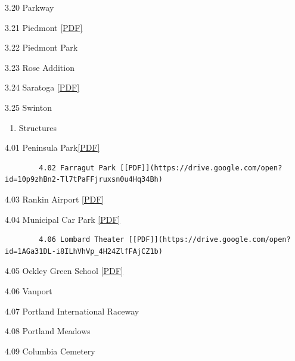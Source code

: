 \documentclass[
  12pt,
]{book}
\providecommand{\tightlist}{%
  \setlength{\itemsep}{0pt}\setlength{\parskip}{0pt}}
\begin{document}
3.20 Parkway

3.21 Piedmont \href{https://l.facebook.com/l.php?u=https\%3A\%2F\%2Fdrive.google.com\%2Fopen\%3Fid\%3D1-9EhdqV51Y03rqUdg9TRgpD-xLiKQvQi\&h=AT3nGsWmXhbQfW9A2d5Qky-O-fy3KsvekepBBd3uEGmoKh0FijpfGT5DpcKsh9-Zt3b2c2v5TnvZ4ddoydn__lb0fA8blySjjnTpQJMzTyYehW2h8JKgDHUh6LYYn_FT-2k1soRzIMc_VGwykcrQHuQRtj1lPaUXkcXBm2k-O_BKdi2HIy7qkHaOH5QPDc3bSqJrKkswdXNRDIUDjrPKAVujS-IMBTKFVtWCKVJEpSgFFfAKkLTlAE5VbJtspKZm0xzSrmJQlieHyWLnEaTGcXlaNmw_BdWhE118AcHAfb1ZybOS0suTqJibOPbAhIOZILkK2Q5GJD38IKvigNVa-f2CDPw724oLFtG4Rkig7ErCQRaAdVf0vdZy2aNrTm2zg8JlxyrXLuMusgNtmo3HhQ}{{[}PDF{]}}

3.22 Piedmont Park

3.23 Rose Addition

3.24 Saratoga \href{https://drive.google.com/open?id=1OHx5hx1NCU-MoAAo68ppMKhZgD1GoYKn}{{[}PDF{]}}

3.25 Swinton

\begin{enumerate}
\def\labelenumi{\arabic{enumi}.}
\setcounter{enumi}{3}
\tightlist
\item
  Structures
\end{enumerate}

4.01 Peninsula Park\href{https://drive.google.com/open?id=1fdXTV5QR_LCgfULxlq1tuFWetOSDZWXF}{{[}PDF{]}}

\begin{verbatim}
        4.02 Farragut Park [[PDF]](https://drive.google.com/open?id=10p9zhBn2-Tl7tPaFFjruxsn0u4Hq34Bh)
\end{verbatim}

4.03 Rankin Airport \href{https://drive.google.com/open?id=18IhFuHFxIyZp1qiESwfkOsqlK6fmfQnH}{{[}PDF{]}}

4.04 Municipal Car Park \href{https://drive.google.com/open?id=0B94Urj3OjM7BeTBxSGwwVW5kZ0E}{{[}PDF{]}}

\begin{verbatim}
        4.06 Lombard Theater [[PDF]](https://drive.google.com/open?id=1AGa31DL-i8ILhVhVp_4H24ZlfFAjCZ1b)
\end{verbatim}

4.05 Ockley Green School \href{https://drive.google.com/open?id=17Du1TnGsbrWakfCaSi3X1GP-bNSK16Xi}{{[}PDF{]}}

4.06 Vanport

4.07 Portland International Raceway

4.08 Portland Meadows

4.09 Columbia Cemetery
\end{document}

